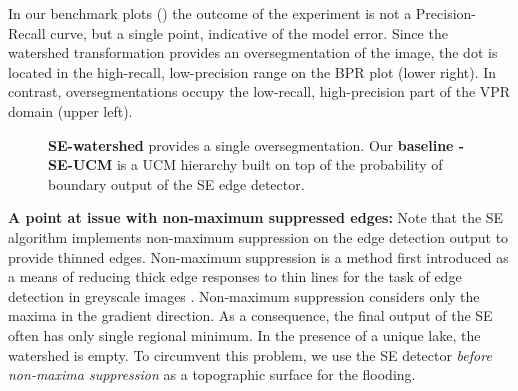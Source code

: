 In our benchmark plots () the outcome of the experiment is not a Precision-Recall curve, but a single point, %
indicative of the model error. Since the watershed transformation provides an oversegmentation of the image, the dot is located in the high-recall, low-precision range on the BPR plot (lower right). In contrast, oversegmentations occupy the low-recall, high-precision part of the VPR domain (upper left). 

\begin{figure}[ht!]
\centering
\caption[SE-watershed and baseline: SE-UCM plots]{{\bf SE-watershed} provides a single oversegmentation. Our {\bf baseline - SE-UCM} is a UCM hierarchy built on top of the probability of boundary output of the SE edge detector.}
\label{fig:SE-watershed}
\end{figure}

\textbf{A point at issue %
with non-maximum suppressed edges:} Note that the SE algorithm implements non-maximum suppression on the edge detection output to provide thinned edges. Non-maximum suppression is a method first introduced as a means of reducing thick edge responses to thin lines for the task of edge detection in greyscale images \cite{Rosenfeld1976digital}. Non-maximum suppression considers only the maxima in the gradient direction. As a consequence, the final output of the SE often has only single regional minimum. In the presence of a unique lake, the watershed is empty. To circumvent this problem, we use the SE detector \textit{before non-maxima suppression} as a topographic surface for the flooding.

